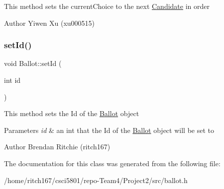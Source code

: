 This method sets the current\+Choice to the next \hyperlink{classCandidate}{Candidate} in order \begin{DoxyAuthor}{Author}
Yiwen Xu (xu000515) 
\end{DoxyAuthor}
\mbox{\label{classBallot_a1dbe98fb3fc76b2fc4f1a0ee40f3c808}} 
\subsubsection{\texorpdfstring{set\+Id()}{setId()}}
{\footnotesize\ttfamily void Ballot\+::set\+Id (\begin{DoxyParamCaption}\item[{int}]{id }\end{DoxyParamCaption})}

This method sets the Id of the \hyperlink{classBallot}{Ballot} object 
\begin{DoxyParams}{Parameters}
{\em id} & an int that the Id of the \hyperlink{classBallot}{Ballot} object will be set to \\
\hline
\end{DoxyParams}
\begin{DoxyAuthor}{Author}
Brendan Ritchie (ritch167) 
\end{DoxyAuthor}


The documentation for this class was generated from the following file\+:\begin{DoxyCompactItemize}
\item 
/home/ritch167/csci5801/repo-\/\+Team4/\+Project2/src/ballot.\+h\end{DoxyCompactItemize}
